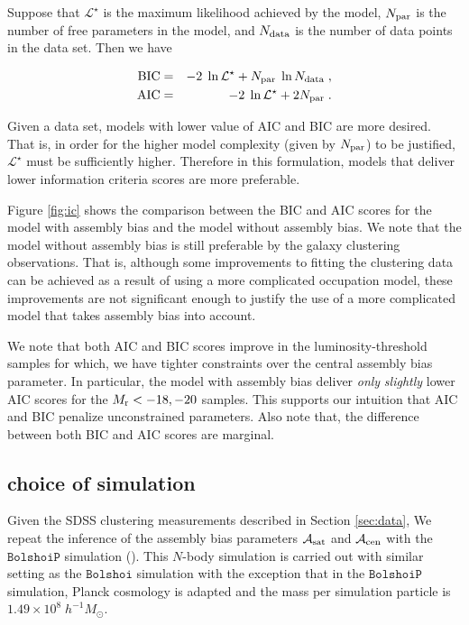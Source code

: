 \documentclass[12pt, preprint]{aastex}
\newcommand{\acen}{\mathcal{A}_{\rm cen}}
\newcommand{\asat}{\mathcal{A}_{\rm sat}}
\begin{document}
Suppose that $\mathcal{L}^{\star}$ is the maximum likelihood achieved by the model, $N_{\rm par}$ is the number of free parameters in the model, and $N_{\rm data}$ is the number of data points in the data set. Then we have

\begin{eqnarray}
\rm{BIC}&=& -2\;\ln \mathcal{L}^{\star} + N_{\rm par}\;\ln N_{\rm data} \; , \label{eq:bic} \\
\rm{AIC}&=& -2\;\ln \mathcal{L}^{\star} + 2N_{\rm par} \; . \label{eq:aic}
\end{eqnarray}

Given a data set, models with lower value of AIC and BIC are more desired. That is, in order for the higher model complexity (given by $N_{\rm par}$) to be justified, $\mathcal{L}^{\star}$ must be sufficiently higher. Therefore in this formulation, models that deliver lower information criteria scores are more preferable. 

Figure \ref{fig:ic} shows the comparison between the BIC and AIC scores for the model with assembly bias and the model without assembly bias. We note that the model without assembly bias is still preferable by the galaxy clustering observations. That is, although some improvements to fitting the clustering data can be achieved as a result of using a more complicated occupation model, these improvements are not significant enough to justify the use of a more complicated model that takes assembly bias into account. 

We note that both AIC and BIC scores improve in the luminosity-threshold samples for which, we have tighter constraints over the central assembly bias parameter. In particular, the model with assembly bias deliver \emph{only} \emph{slightly} lower AIC scores for the $M_{\rm r}<-18, -20$ samples. This supports our intuition that AIC and BIC penalize unconstrained parameters. Also note that, the difference between both BIC and AIC scores are marginal.

\subsection{choice of simulation}

Given the SDSS clustering measurements described in Section \ref{sec:data}, We repeat the inference of the assembly bias parameters $\asat$ and $\acen$ with the $\mathtt{BolshoiP}$ simulation (\citealt{smallmultidark}). This $N$-body simulation is carried out with similar setting as the $\mathtt{Bolshoi}$ simulation with the exception that in the $\mathtt{BolshoiP}$ simulation, Planck cosmology is adapted and the mass per simulation particle is $1.49\times 10^8 \; h^{-1} M_{\odot}$. 
\end{document}
